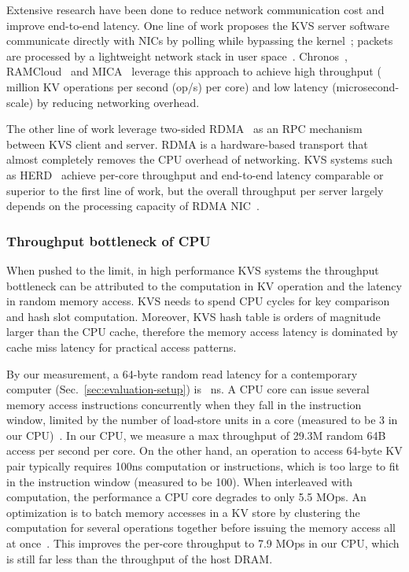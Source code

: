 {Extensive research have been done to reduce network communication cost and improve end-to-end latency.
One line of work proposes the KVS server software communicate directly with NICs by polling while bypassing the kernel~\cite{rizzo2012netmap, intel2014data}; packets are processed by a lightweight network stack in user space~\cite{jeong2014mtcp, marinos2014network}.
Chronos~\cite{kapoor2012chronos}, RAMCloud~\cite{ousterhout2010case, ousterhout2015ramcloud} and MICA~\cite{lim2014mica,li2016full} leverage this approach to achieve high throughput ( million KV operations per second (op/s) per core) and low latency (microsecond-scale) by reducing networking overhead.

The other line of work leverage two-sided RDMA~\cite{infiniband2000infiniband} as an RPC mechanism between KVS client and server.
RDMA is a hardware-based transport that almost completely removes the CPU overhead of networking.
KVS systems such as HERD~\cite{kalia2014using, kalia2016design} achieve per-core throughput and end-to-end latency comparable or superior to the first line of work, but the overall throughput per server largely depends on the processing capacity of RDMA NIC~\cite{kalia2016design}.

\subsubsection{Throughput bottleneck of CPU}
\label{sec:CPU-KV-Bottleneck}
When pushed to the limit, in high performance KVS systems the throughput bottleneck can be attributed to the computation in KV operation and the latency in random memory access. KVS needs to spend CPU cycles for key comparison and hash slot computation. Moreover, KVS hash table is orders of magnitude larger than the CPU cache, therefore the memory access latency is dominated by cache miss latency for practical access patterns.

By our measurement, a 64-byte random read latency for a contemporary computer (Sec.~\ref{sec:evaluation-setup}) is ~ns. A CPU core can issue several memory access instructions concurrently when they fall in the instruction window, limited by the number of load-store units in a core (measured to be 3 in our CPU)~\cite{gharachorloo1992hiding, han2010packetshader, zhang2015mega}. In our CPU, we measure a max throughput of 29.3M random 64B access per second per core. On the other hand, an operation to access 64-byte KV pair typically requires \approx100ns computation or  instructions, which is too large to fit in the instruction window (measured to be 100). When interleaved with computation, the performance a CPU core degrades to only 5.5 MOps. An optimization is to batch memory accesses in a KV store by clustering the computation for several operations together before issuing the memory access all at once~\cite{li2016full, narula2014phase}. This improves the per-core throughput to 7.9 MOps in our CPU, which is still far less than the throughput of the host DRAM. 
}

